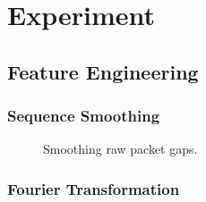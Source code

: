 \section{Experiment}
\label{sec:experiment}
\subsection{Feature Engineering}
\label{sub:feature_engineering}
\subsubsection{Sequence Smoothing}
\label{ssub:sequence_smoothing}
\begin{figure}[htpb]
   \centering
   \quad
   \caption{Smoothing raw packet gaps.}
   \label{fig:smoothing}
\end{figure}

\subsubsection{Fourier Transformation}
\label{ssub:fourier_transformation}

